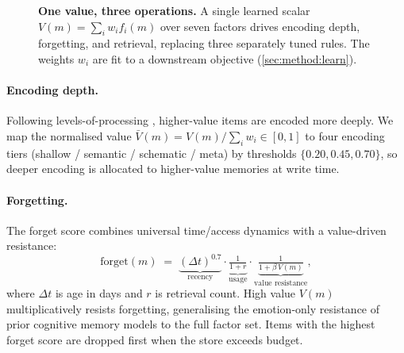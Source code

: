 \begin{figure}[ht!]
\centering
{}
\caption{\textbf{One value, three operations.} A single learned scalar
$V(m)=\sum_i w_i f_i(m)$ over seven factors drives encoding depth,
forgetting, and retrieval, replacing three separately tuned rules. The
weights $w_i$ are fit to a downstream objective (\cref{sec:method:learn}).}
\label{fig:schematic}
\end{figure}

\paragraph{Encoding depth.}
Following levels-of-processing \citep{craik1972lop}, higher-value items
are encoded more deeply. We map the normalised value
$\bar V(m)=V(m)/\sum_i w_i \in[0,1]$ to four encoding tiers
(shallow / semantic / schematic / meta) by thresholds
$\{0.20,0.45,0.70\}$, so deeper encoding is allocated to higher-value
memories at write time.

\paragraph{Forgetting.}
The forget score combines universal time/access dynamics with a
value-driven resistance:
\begin{equation}
\mathrm{forget}(m) \;=\;
\underbrace{(\Delta t)^{0.7}}_{\text{recency}}
\cdot
\underbrace{\tfrac{1}{1+r}}_{\text{usage}}
\cdot
\underbrace{\tfrac{1}{1+\beta\,V(m)}}_{\text{value resistance}},
\label{eq:forget}
\end{equation}
where $\Delta t$ is age in days and $r$ is retrieval count. High value
$V(m)$ multiplicatively resists forgetting, generalising the
emotion-only resistance of prior cognitive memory models to the full
factor set. Items with the highest forget score are dropped first when
the store exceeds budget.

